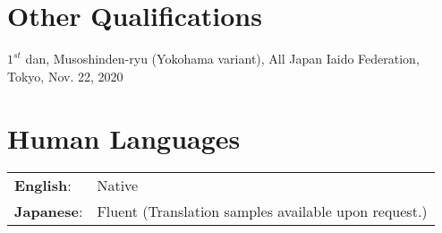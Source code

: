 \section*{Other Qualifications}
$1^{st}$ dan, Musoshinden-ryu (Yokohama variant), All Japan Iaido Federation, Tokyo, Nov. 22, 2020\\

\section*{Human Languages}
\begin{tabular}{l l}

{\bf English}: & Native \\
{\bf Japanese}: & Fluent (Translation samples available upon request.) \\

\end{tabular}

